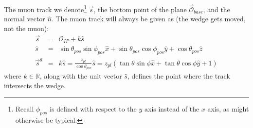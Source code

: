 The muon track we denote\footnote{Recall $\phi_{pos}$ is defined with respect to the $y$ axis instead of the $x$ axis, as might otherwise be typical.} $\vec{s}$, the bottom point of the plane $\vec{\mathscr{O}}_{base}$, and the normal vector $\hat{n}$.  The muon track will always be given as (the wedge gets moved, not the muon):
\begin{eqnarray}
\vec{s}&=&\mathscr{O}_{IP}+k\hat{s}\\
\hat{s}&=&\sin\theta_{pos}\sin\phi_{pos}\hat{x}+\sin\theta_{pos}\cos\phi_{pos}\hat{y}+\cos\theta_{pos}\hat{z}\\
\vec{s}^g&=&k\hat{s}=\frac{z_{pl}}{\cos\theta_{pos}}\hat{s}=z_{pl}\left(\tan\theta\sin\phi\hat{x}+\tan\theta\cos\phi\hat{y}+1\right)
\end{eqnarray}
where $k\in\mathbb{R}$, along with the unit vector $\hat{s}$, defines the point where the track intersects the wedge.


